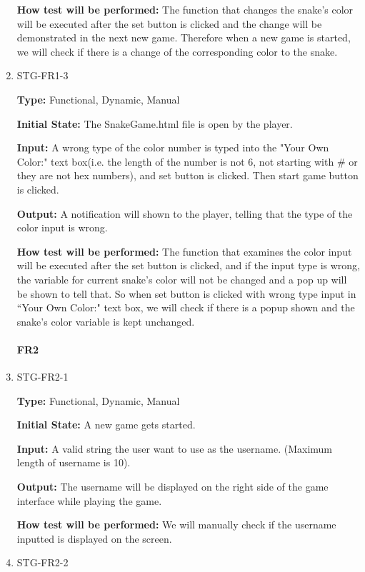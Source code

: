 \documentclass[12pt, titlepage]{article}
\begin{document}
\begin{enumerate}
\textbf{How test will be performed:} The function that changes the snake's color will be executed after the set button is clicked and the change will be demonstrated in the next new game. Therefore when a new game is started, we will check if there is a change of the corresponding color to the snake.

\item{STG-FR1-3\\}

\textbf{Type:} Functional, Dynamic, Manual

\textbf{Initial State:} The SnakeGame.html file is open by the player.

\textbf{Input:} A wrong type of the color number is typed into the "Your Own Color:" text box(i.e. the length of the number is not 6, not starting with \# or they are not hex numbers), and set button is clicked. Then start game button is clicked.

\textbf{Output:} A notification will shown to the player, telling that the type of the color input is wrong.

\textbf{How test will be performed:} The function that examines the color input will be executed after the set button is clicked, and if the input type is wrong, the variable for current snake's color will not be changed and a pop up will be shown to tell that. So when set button is clicked with wrong type input in ``Your Own Color:" text box, we will check if there is a popup shown and the snake's color variable is kept unchanged.

\paragraph{FR2}
\item{STG-FR2-1\\}

\textbf{Type:} Functional, Dynamic, Manual

\textbf{Initial State:} A new game gets started.

\textbf{Input:} A valid string the user want to use as the username. (Maximum length of username is 10).

\textbf{Output:} The username will be displayed on the right side of the game interface while playing the game.

\textbf{How test will be performed:} We will manually check if the username inputted is displayed on the screen.

\item{STG-FR2-2\\}


\end{enumerate}
\end{document}

